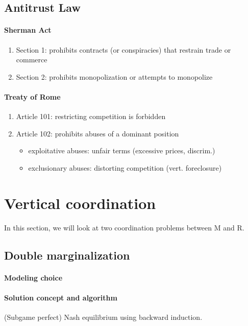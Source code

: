 \subsection{Antitrust Law}
\paragraph{Sherman Act}
\begin{enumerate}
    \item Section 1: prohibits contracts (or conspiracies) that restrain trade or commerce
    \item Section 2: prohibits monopolization or attempts to monopolize
\end{enumerate}
\paragraph{Treaty of Rome}
\begin{enumerate}
    \item Article 101: restricting competition is forbidden
    \item Article 102: prohibits abuses of a dominant position
    \begin{itemize}
        \item exploitative abuses: unfair terms (excessive prices, discrim.)
        \item exclusionary abuses: distorting competition (vert. foreclosure)
    \end{itemize}
\end{enumerate}

\section{Vertical coordination}
In this section, we will look at two coordination problems between M and R.
\subsection{Double marginalization}
\paragraph{Modeling choice}



\paragraph{Solution concept and algorithm} (Subgame perfect) Nash equilibrium using backward induction.

